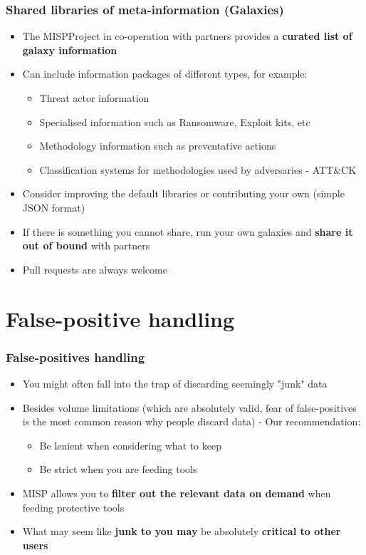 \begin{frame}
\frametitle{Shared libraries of meta-information (Galaxies)}
\begin{itemize}
    \item The MISPProject in co-operation with partners provides a \textbf{curated list of galaxy information}
	\item Can include information packages of different types, for example:
	\begin{itemize}
		\item Threat actor information
		\item Specialised information such as Ransomware, Exploit kits, etc
		\item Methodology information such as preventative actions
		\item Classification systems for methodologies used by adversaries - ATT\&CK
	\end{itemize}
	\item Consider improving the default libraries or contributing your own (simple JSON format)
    \item If there is something you cannot share, run your own galaxies and \textbf{share it out of bound} with partners
	\item Pull requests are always welcome
\end{itemize}
\end{frame}

\section{False-positive handling}

\begin{frame}
\frametitle{False-positives handling}
\begin{itemize}
	\item You might often fall into the trap of discarding seemingly "junk" data
	\item Besides volume limitations (which are absolutely valid, fear of false-positives is the most common reason why people discard data) - Our recommendation:
	\begin{itemize}
		\item Be lenient when considering what to keep
		\item Be strict when you are feeding tools
	\end{itemize}
\item MISP allows you to \textbf{filter out the relevant data on demand} when feeding protective tools
\item What may seem like \textbf{junk to you may} be absolutely \textbf{critical to other users}
\end{itemize}
\end{frame}

